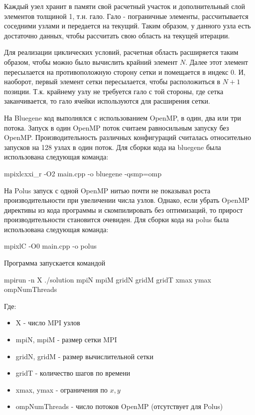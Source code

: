 \documentclass[12pt,a4paper]{scrartcl}
\begin{document}
Каждый узел хранит в памяти свой расчетный участок и дополнительный слой элементов толщиной 1, т.н. гало. Гало - пограничные элементы,
рассчитывается соседними узлами и передается на текущий.
Таким образом, у данного узла есть достаточно данных, чтобы рассчитать свою область на текущей итерации.

Для реализации циклических условий, расчетная область расширяется таким образом, чтобы можно было вычислить крайний элемент $N$.
Далее этот элемент пересылается на противоположную сторону сетки и помещается в индекс $0$. И, наоборот, первый элемент сетки
пересылается, чтобы расположиться в $N+1$ позиции. Т.к. крайнему узлу не требуется гало с той стороны, где сетка заканчивается,
то гало ячейки используются для расширения сетки.

На Bluegene код выполнялся с использованием OpenMP, в один, два или три потока. 
Запуск в один OpenMP поток считаем равносильным запуску без OpenMP. Производительность различных конфигураций
считалась относительно запусков на 128 узлах в один поток. Для сборки кода на bluegene была использована следующая команда:

\begin{center}
\small
mpixlcxxi\_r -O2 main.cpp -o bluegene -qsmp=omp
\end{center}

На Polus запуск с одной OpenMP нитью почти не показывал роста производительности
при увеличении числа узлов. Однако, если убрать OpenMP директивы из кода программы и скомпилировать без оптимизаций,
то прирост производительности становится очевиден. Для сборки кода на polus была использована следующая команда:

\begin{center}
\small
mpixlC -O0 main.cpp -o polus
\end{center}

Программа запускается командой

\begin{center}
\small
mpirun -n X ./solution mpiN mpiM gridN gridM gridT xmax ymax ompNumThreads
\end{center}

Где:
\begin{itemize}
    \item X - число MPI узлов
    \item mpiN, mpiM - размер сетки MPI
    \item gridN, gridM - размер вычислительной сетки
    \item gridT - количество шагов по времени
    \item xmax, ymax - ограничения по $x, y$
    \item ompNumThreads - число потоков OpenMP (отсутствует для Polus)
\end{itemize}
\end{document}
